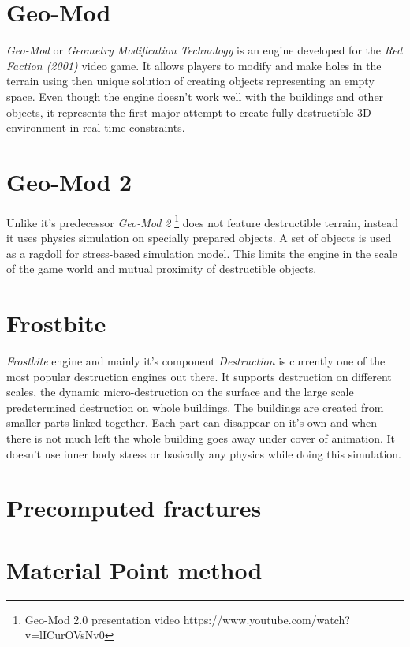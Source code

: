 \section{Geo-Mod}
\emph{Geo-Mod} \cite{geomod} or \emph{Geometry Modification Technology} is an engine developed for the \emph{Red Faction (2001)} \cite{redfaction} video game. It allows players to modify and make holes in the terrain using then unique solution of creating objects representing an empty space. Even though the engine doesn't work well with the buildings and other objects, it represents the first major attempt to create fully destructible 3D environment in real time constraints.

\section{Geo-Mod 2}
Unlike it's predecessor \emph{Geo-Mod 2} \cite{geomod}\footnote{Geo-Mod 2.0 presentation video https://www.youtube.com/watch?v=lICurOVsNv0} does not feature destructible terrain, instead it uses physics simulation on specially prepared objects. A set of objects is used as a ragdoll for stress-based simulation model. This limits the engine in the scale of the game world and mutual proximity of destructible objects.

\section{Frostbite}
\emph{Frostbite} \cite{frostbite} engine and mainly it's component \emph{Destruction} \cite{destruction} is currently one of the most popular destruction engines out there. It supports destruction on different scales, the dynamic micro-destruction on the surface and the large scale predetermined destruction on whole buildings. The buildings are created from smaller parts linked together. Each part can disappear on it's own and when there is not much left the whole building goes away under cover of animation. 
It doesn't use inner body stress or basically any physics while doing this simulation.

\section{Precomputed fractures}


\section{Material Point method}

